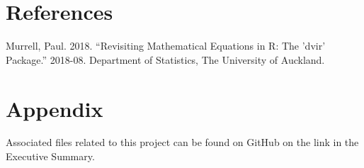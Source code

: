 \documentclass[]{article}
\begin{document}
\newpage

\section{References}\label{references}

\hypertarget{refs}{}
\hypertarget{ref-murrell-dvir}{}
Murrell, Paul. 2018. ``Revisiting Mathematical Equations in R: The
'dvir' Package.'' 2018-08. Department of Statistics, The University of
Auckland.

\newpage{}

\section{Appendix}\label{appendix}

Associated files related to this project can be found on GitHub on the
link in the Executive Summary.
\end{document}
